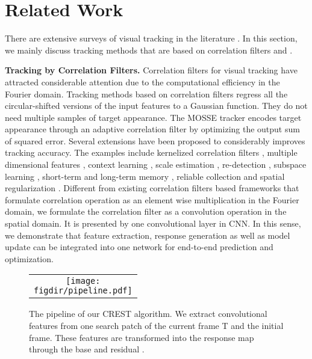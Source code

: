 \documentclass[10pt,twocolumn,letterpaper]{article}
\newcommand{\figdir}{figures}
\newcommand{\ryn}[1]{{\color{black}{#1}}}
\begin{document}
\section{Related Work}
There are extensive surveys of visual tracking in the literature \cite{yilmaz-acm06-object,salti-tip12-adaptive,smeulders-pami14-visual}. In this section, we mainly discuss tracking methods that are based on correlation filters and \ryn{CNNs}.

{\flushleft \bf Tracking by Correlation Filters.} Correlation filters for visual tracking have attracted considerable attention due to the computational efficiency in the Fourier domain. Tracking methods based on correlation filters regress all the circular-shifted versions of the input features to a Gaussian function. They do not need multiple samples of target appearance. The MOSSE tracker \cite{bolme-cvpr10-mosse} encodes target appearance through an adaptive correlation filter by optimizing the output sum of squared error. Several extensions have been proposed to considerably improves tracking accuracy. The examples include kernelized correlation filters \cite{Henriques-eccv12-DCF}, multiple dimensional features \cite{martin-cvpr14-adaptive,henriques-pami15-high}, context learning \cite{zhang-eccv14-fast}, scale estimation \cite{martin-bmvc14-accurate}, re-detection \cite{ma-cvpr15-lct}, subspace learning \cite{liu-cvpr15-real}, short-term and long-term memory \cite{hong-cvpr15-muster}, reliable collection \cite{li-cvpr15-reliable} and spatial regularization \cite{martin-iccv15-learning}. Different from existing correlation filters based frameworks that formulate correlation operation as an element wise multiplication in the Fourier domain, we formulate the correlation filter as a convolution operation in the spatial domain. It is presented by one convolutional layer in CNN. In this sense, we demonstrate that feature extraction, response generation as well as model update can be integrated into one network for end-to-end prediction and optimization.


\begin{figure*}[t]
\begin{center}
\begin{tabular}{c}
\texttt{[image: \\figdir/pipeline.pdf]}\\
\end{tabular}
\end{center}
\vspace{-5mm}
\caption{The pipeline of our CREST algorithm. We extract convolutional features from one search patch of the current frame T and the initial frame. These features are transformed into the response map through the base and residual \ryn{mappings}.}
\label{fig:pipeline}
\vspace{-3mm}
\end{figure*}
\end{document}
